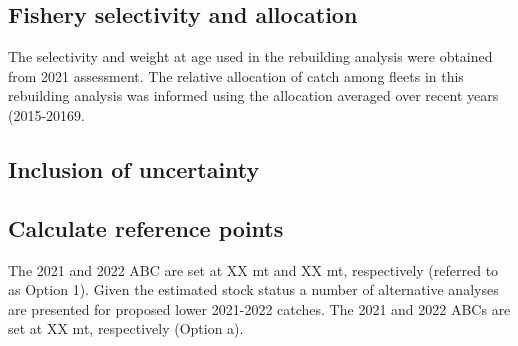 \documentclass[11pt,
  english,
  a4paper,
]{article}
\begin{document}

\hypertarget{fishery-selectivity-and-allocation}{%
\subsection{Fishery selectivity and allocation}\label{fishery-selectivity-and-allocation}}

\leavevmode\tagmcend\tagstructend


The selectivity and weight at age used in the rebuilding analysis were obtained from 2021 assessment. The relative allocation of catch among fleets in this rebuilding analysis was informed using the allocation averaged over recent years (2015-20169.

\leavevmode\tagmcend\tagstructend\par


\hypertarget{inclusion-of-uncertainty}{%
\subsection{Inclusion of uncertainty}\label{inclusion-of-uncertainty}}

\leavevmode\tagmcend\tagstructend


\hypertarget{calculate-reference-points}{%
\subsection{Calculate reference points}\label{calculate-reference-points}}

\leavevmode\tagmcend\tagstructend


The 2021 and 2022 ABC are set at XX mt and XX mt, respectively (referred to as Option 1). Given the estimated stock status a number of alternative analyses are presented for proposed lower 2021-2022 catches. The 2021 and 2022 ABCs are set at XX mt, respectively (Option a).

\leavevmode\tagmcend\tagstructend\par

\end{document}
